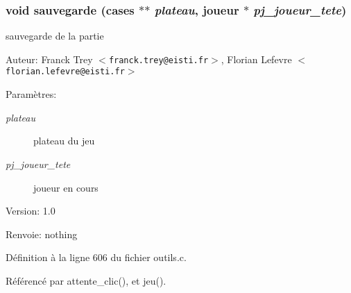 \subsubsection{\setlength{\rightskip}{0pt plus 5cm}void sauvegarde ({\bf cases} $\ast$$\ast$ {\em plateau}, {\bf joueur} $\ast$ {\em pj\_\-joueur\_\-tete})}\label{outils_8h_113ece66046fa3db3fed49a3ada1b36e}


sauvegarde de la partie 

\begin{Desc}
\item[Auteur:]Franck Trey $<${\tt franck.trey@eisti.fr}$>$, Florian Lefevre $<${\tt florian.lefevre@eisti.fr}$>$\end{Desc}
\begin{Desc}
\item[Param\`{e}tres:]
\begin{description}
\item[{\em plateau}]plateau du jeu \item[{\em pj\_\-joueur\_\-tete}]joueur en cours\end{description}
\end{Desc}
\begin{Desc}
\item[Version:]1.0 \end{Desc}
\begin{Desc}
\item[Renvoie:]nothing \end{Desc}


D\'{e}finition \`{a} la ligne 606 du fichier outils.c.

R\'{e}f\'{e}renc\'{e} par attente\_\-clic(), et jeu().

